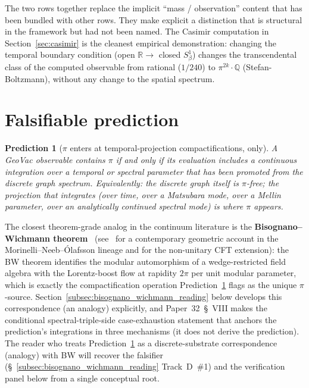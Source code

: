 \documentclass[11pt]{article}
\newtheorem{prediction}{Prediction}
\begin{document}
The two rows together replace the implicit ``mass / observation''
content that has been bundled with other rows.  They make explicit a
distinction that is structural in the framework but had not been named.
The Casimir computation in Section~\ref{sec:casimir} is the cleanest
empirical demonstration: changing the temporal boundary condition
(open $\mathbb{R} \to$ closed $S^1_\beta$) changes the transcendental
class of the computed observable from rational ($1/240$) to
$\pi^{2k} \cdot \mathbb{Q}$ (Stefan-Boltzmann), without any change to
the spatial spectrum.


\section{Falsifiable prediction}
\label{sec:prediction}

\begin{prediction}[$\pi$ enters at temporal-projection compactifications, only]
\label{pred:pi_iff_temporal}
A GeoVac observable contains $\pi$ if and only if its evaluation
includes a continuous integration over a temporal or spectral parameter
that has been promoted from the discrete graph spectrum.  Equivalently:
the discrete graph itself is $\pi$-free; the projection that
\emph{integrates} (over time, over a Matsubara mode, over a Mellin
parameter, over an analytically continued spectral mode) is where $\pi$
appears.
\end{prediction}

The closest theorem-grade analog in the continuum literature is the
\textbf{Bisognano--Wichmann theorem}~\cite{bisognano_wichmann1976}
(see~\cite{morinelli2024_geometric_aqft} for a contemporary
geometric account in the Morinelli--Neeb--\'Olafsson lineage and
\cite{tener2025_bw_nonunitary} for the non-unitary CFT extension):
the BW theorem identifies the modular automorphism of a wedge-restricted
field algebra with the Lorentz-boost flow at rapidity $2\pi$ per unit
modular parameter, which is exactly the compactification operation
Prediction~\ref{pred:pi_iff_temporal} flags as the unique $\pi$-source.
Section~\ref{subsec:bisognano_wichmann_reading} below develops this
correspondence (an analogy) explicitly, and Paper~32~\S~VIII makes the
conditional spectral-triple-side case-exhaustion statement that
anchors the prediction's integrations in three mechanisms (it does
not derive the prediction). The reader who treats
Prediction~\ref{pred:pi_iff_temporal} as a discrete-substrate
correspondence (analogy) with BW will recover the falsifier
(\S~\ref{subsec:bisognano_wichmann_reading} Track~D~\#1) and the
verification panel below from a single conceptual root.
\end{document}
